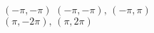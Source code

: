 { $\left( -\pi, -\pi \right)$  \label{polarpointgraphlast}}
{$\left(-\pi, -\pi \right), \, \left( -\pi, \pi \right)$\\$\left( \pi, -2\pi \right), \, \left( \pi, 2\pi  \right)$\\ }
